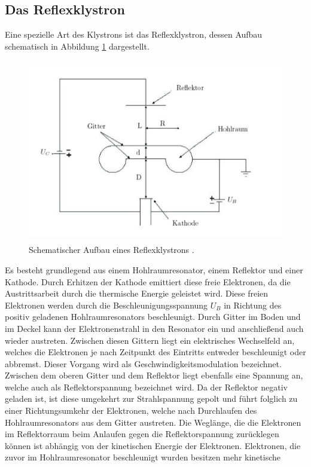 \subsection{Das Reflexklystron}
Eine spezielle Art des Klystrons ist das Reflexklystron, dessen Aufbau schematisch in Abbildung \ref{fig:kly}
dargestellt.
\begin{figure}[H]
  \centering
  \includegraphics[height=8cm]{kly.png}
  \caption{Schematischer Aufbau eines Reflexklystrons \cite{Kly}.}
  \label{fig:kly}
\end{figure}
Es besteht grundlegend aus einem Hohlraumresonator, einem Reflektor und einer Kathode.
Durch Erhitzen der Kathode emittiert diese freie Elektronen, da die Austrittsarbeit durch die thermische
Energie geleistet wird. Diese freien Elektronen werden durch die Beschleunigungsspannung $U_B$ in Richtung
des positiv geladenen Hohlraumresonators beschleunigt. Durch Gitter im Boden und im Deckel kann der Elektronenstrahl
in den Resonator ein und anschließend auch wieder austreten. Zwischen diesen Gittern liegt ein elektrisches
Wechselfeld an, welches die Elektronen je nach Zeitpunkt des Eintritts entweder beschleunigt oder
abbremst. Dieser Vorgang wird als Geschwindigkeitsmodulation bezeichnet. Zwischen dem oberen Gitter und dem
Reflektor liegt ebenfalls eine Spannung an, welche auch als Reflektorspannung bezeichnet wird. Da der Reflektor negativ
geladen ist, ist diese umgekehrt zur Strahlspannung gepolt und führt folglich zu einer Richtungsumkehr der
Elektronen, welche nach Durchlaufen des Hohlraumresonators aus dem Gitter austreten. Die Weglänge, die die
Elektronen im Reflektorraum beim Anlaufen gegen die Reflektorspannung zurücklegen können ist abhängig von der kinetischen
Energie der Elektronen. Elektronen, die zuvor im Hohlraumresonator beschleunigt wurden besitzen mehr kinetische
